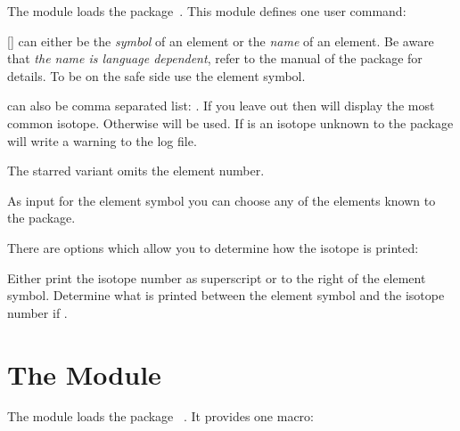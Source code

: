 \documentclass{chemmacros-manual}
\begin{document}
The  module loads the 
package~\cite{pkg:elements}.  This module defines one user command:
\begin{commands}
  [\sarg{}]
     can either be the \emph{symbol} of an element or the
    \emph{name} of an element.  Be aware that \emph{the name is language
      dependent}, refer to the manual of the  package for
    details.  To be on the safe side use the element symbol.

     can also be comma separated list:
    .  If you leave  out
    then  will display the most common isotope.  Otherwise
     will be used.  If  is an isotope unknown to the
     package  will write a warning to the log file.

    The starred variant omits the element number.
\end{commands}

\begin{example}
\end{example}

As input for the element symbol you can choose any of the elements known to
the  package.

There are options which allow you to determine how the isotope is printed:
\begin{options}
    Either print the isotope number as superscript or to the right of the
    element symbol.
  \Initial{-}
    Determine what is printed between the element symbol and the isotope
    number if .
\end{options}

\begin{example}
\end{example}

\section{The  Module}\label{sec:mechanisms-module}

The module  loads the package
~\cite{pkg:amstext}.  It provides one macro:
\end{document}
